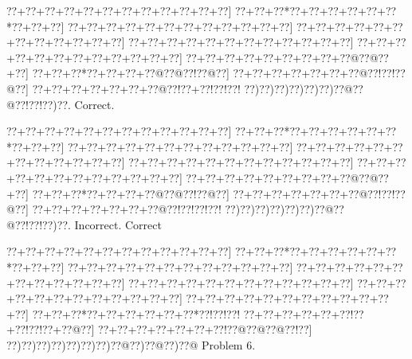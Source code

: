 \documentclass[a5paper]{article}
\begin{document}
\begin{center}
{\goo
\0??+\0??+\0??+\0??+\0??+\0??+\0??+\0??+\0??+\0??+\0??+\0??]
\0??+\0??+\0??*\0??+\0??+\0??+\0??+\0??+\0??*\0??+\0??+\0??]
\0??+\0??+\0??+\0??+\0??+\0??+\0??+\0??+\0??+\0??+\0??+\0??]
\0??+\0??+\0??+\0??+\0??+\0??+\0??+\0??+\0??+\0??+\0??+\0??]
\0??+\0??+\0??+\0??+\0??+\0??+\0??+\0??+\0??+\0??+\0??+\0??]
\0??+\0??+\0??+\0??+\0??+\0??+\0??+\0??+\0??+\0??+\0??+\0??]
\0??+\0??+\0??+\0??+\0??+\0??+\0??+\0??+\0??@\0??@\0??+\0??]
\0??+\0??+\0??*\0??+\0??+\0??+\0??@\0??@\0??!\0??@\0??]
\0??+\0??+\0??+\0??+\0??+\0??+\0??@\0??!\0??!\0??@\0??]
\0??+\0??+\0??+\0??+\0??+\0??+\0??@\0??!\0??+\0??!\0??!\0??!
\0??)\0??)\0??)\0??)\0??)\0??)\0??@\0??@\0??!\0??!\0??)\0??.
}
Correct. 

\end{center}
\begin{center}
{\goo
\0??+\0??+\0??+\0??+\0??+\0??+\0??+\0??+\0??+\0??+\0??+\0??]
\0??+\0??+\0??*\0??+\0??+\0??+\0??+\0??+\0??*\0??+\0??+\0??]
\0??+\0??+\0??+\0??+\0??+\0??+\0??+\0??+\0??+\0??+\0??+\0??]
\0??+\0??+\0??+\0??+\0??+\0??+\0??+\0??+\0??+\0??+\0??+\0??]
\0??+\0??+\0??+\0??+\0??+\0??+\0??+\0??+\0??+\0??+\0??+\0??]
\0??+\0??+\0??+\0??+\0??+\0??+\0??+\0??+\0??+\0??+\0??+\0??]
\0??+\0??+\0??+\0??+\0??+\0??+\0??+\0??+\0??@\0??@\0??+\0??]
\0??+\0??+\0??*\0??+\0??+\0??+\0??@\0??@\0??!\0??@\0??]
\0??+\0??+\0??+\0??+\0??+\0??+\0??@\0??!\0??!\0??@\0??]
\0??+\0??+\0??+\0??+\0??+\0??+\0??@\0??!\0??!\0??!\0??!
\0??)\0??)\0??)\0??)\0??)\0??)\0??@\0??@\0??!\0??!\0??)\0??.
}
Incorrect. Correct

\end{center}
\newpage
\begin{center}
{\goo
\0??+\0??+\0??+\0??+\0??+\0??+\0??+\0??+\0??+\0??+\0??+\0??]
\0??+\0??+\0??*\0??+\0??+\0??+\0??+\0??+\0??*\0??+\0??+\0??]
\0??+\0??+\0??+\0??+\0??+\0??+\0??+\0??+\0??+\0??+\0??+\0??]
\0??+\0??+\0??+\0??+\0??+\0??+\0??+\0??+\0??+\0??+\0??+\0??]
\0??+\0??+\0??+\0??+\0??+\0??+\0??+\0??+\0??+\0??+\0??+\0??]
\0??+\0??+\0??+\0??+\0??+\0??+\0??+\0??+\0??+\0??+\0??+\0??]
\0??+\0??+\0??+\0??+\0??+\0??+\0??+\0??+\0??+\0??+\0??+\0??]
\0??+\0??+\0??*\0??+\0??+\0??+\0??+\0??+\0??*\0??!\0??!\0??!
\0??+\0??+\0??+\0??+\0??+\0??!\0??+\0??!\0??!\0??+\0??@\0??]
\0??+\0??+\0??+\0??+\0??+\0??+\0??!\0??@\0??@\0??@\0??!\0??]
\0??)\0??)\0??)\0??)\0??)\0??)\0??)\0??@\0??)\0??@\0??)\0??@
}
Problem 6.

\end{center}
\end{document}

